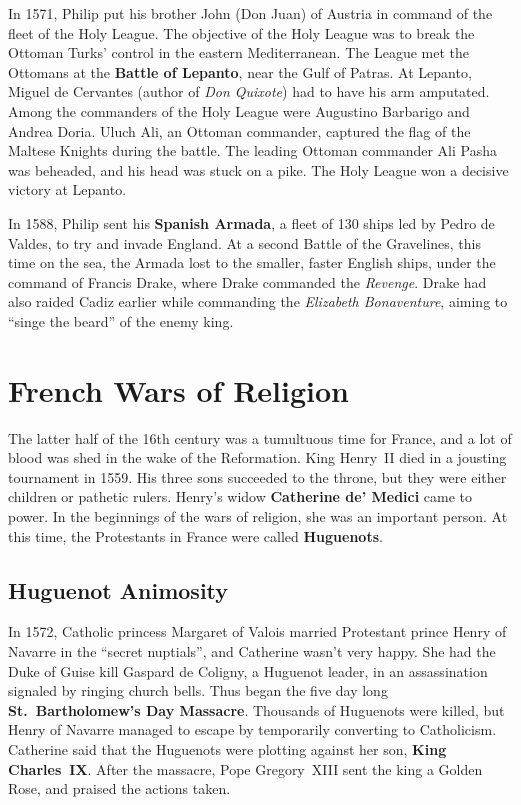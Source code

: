 In 1571, Philip put his brother John (Don Juan) of Austria in command of the fleet of the Holy League.
The objective of the Holy League was to break the Ottoman Turks' control in the eastern Mediterranean.
The League met the Ottomans at the \textbf{Battle of Lepanto}, near the Gulf of Patras.
At Lepanto, Miguel de Cervantes (author of \textit{Don Quixote}) had to have his arm amputated.
Among the commanders of the Holy League were Augustino Barbarigo and Andrea Doria.
Uluch Ali, an Ottoman commander, captured the flag of the Maltese Knights during the battle.
The leading Ottoman commander Ali Pasha was beheaded, and his head was stuck on a pike.
The Holy League won a decisive victory at Lepanto.

In 1588, Philip sent his \textbf{Spanish Armada}, a fleet of 130 ships led by Pedro de Valdes,
to try and invade England.
At a second Battle of the Gravelines, this time on the sea,
the Armada lost to the smaller, faster English ships, under the command of Francis Drake,
where Drake commanded the \textit{Revenge}.
Drake had also raided Cadiz earlier while commanding the \textit{Elizabeth Bonaventure},
aiming to ``singe the beard'' of the enemy king.

\section{French Wars of Religion}

The latter half of the 16th century was a tumultuous time for France,
and a lot of blood was shed in the wake of the Reformation.
King Henry~II died in a jousting tournament in 1559.
His three sons succeeded to the throne, but they were either children or pathetic rulers.
Henry's widow \textbf{Catherine de' Medici} came to power.
In the beginnings of the wars of religion, she was an important person.
At this time, the Protestants in France were called \textbf{Huguenots}.

\subsection*{Huguenot Animosity}

In 1572, Catholic princess Margaret of Valois married
Protestant prince Henry of Navarre in the ``secret nuptials'', and Catherine wasn't very happy.
She had the Duke of Guise kill Gaspard de Coligny, a Huguenot leader,
in an assassination signaled by ringing church bells.
Thus began the five day long \textbf{St.\ Bartholomew's Day Massacre}.
Thousands of Huguenots were killed, but Henry of Navarre managed to escape by temporarily converting to Catholicism.
Catherine said that the Huguenots were plotting against her son, \textbf{King Charles~IX}\@.
After the massacre, Pope Gregory~XIII sent the king a Golden Rose, and praised the actions taken.

